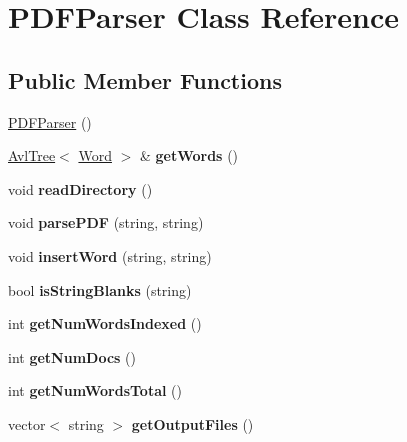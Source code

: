 \hypertarget{classPDFParser}{}\section{P\+D\+F\+Parser Class Reference}
\label{classPDFParser}
\subsection*{Public Member Functions}
\begin{DoxyCompactItemize}
\item 
\hyperlink{classPDFParser_a8b9bcbd81c546391539e1477ed1f7c78}{P\+D\+F\+Parser} ()
\item 
\hyperlink{classAvlTree}{Avl\+Tree}$<$ \hyperlink{classWord}{Word} $>$ \& {\bfseries get\+Words} ()\hypertarget{classPDFParser_a67f4b732c5e457352cdfbab3a001872e}{}\label{classPDFParser_a67f4b732c5e457352cdfbab3a001872e}

\item 
void {\bfseries read\+Directory} ()\hypertarget{classPDFParser_a8871d5d92335d73a24c8f71b0ef1e8ee}{}\label{classPDFParser_a8871d5d92335d73a24c8f71b0ef1e8ee}

\item 
void {\bfseries parse\+P\+DF} (string, string)\hypertarget{classPDFParser_a8acd59b7027368a8d5995b6dad8fec3a}{}\label{classPDFParser_a8acd59b7027368a8d5995b6dad8fec3a}

\item 
void {\bfseries insert\+Word} (string, string)\hypertarget{classPDFParser_a963d4bcee2968ba84505a8a93b3f3ed1}{}\label{classPDFParser_a963d4bcee2968ba84505a8a93b3f3ed1}

\item 
bool {\bfseries is\+String\+Blanks} (string)\hypertarget{classPDFParser_a58926a4db4881a1b4b54dde0dc240e49}{}\label{classPDFParser_a58926a4db4881a1b4b54dde0dc240e49}

\item 
int {\bfseries get\+Num\+Words\+Indexed} ()\hypertarget{classPDFParser_a08e113cb588d1f961f0937a70854013e}{}\label{classPDFParser_a08e113cb588d1f961f0937a70854013e}

\item 
int {\bfseries get\+Num\+Docs} ()\hypertarget{classPDFParser_a252bf201eed7a1c4c8f546fb5b2763ef}{}\label{classPDFParser_a252bf201eed7a1c4c8f546fb5b2763ef}

\item 
int {\bfseries get\+Num\+Words\+Total} ()\hypertarget{classPDFParser_ae0e550866dfba5acffa291488fa7defb}{}\label{classPDFParser_ae0e550866dfba5acffa291488fa7defb}

\item 
vector$<$ string $>$ {\bfseries get\+Output\+Files} ()\hypertarget{classPDFParser_a0f20f646c828e92dadf69c118bcb0cd1}{}\label{classPDFParser_a0f20f646c828e92dadf69c118bcb0cd1}

\end{DoxyCompactItemize}


